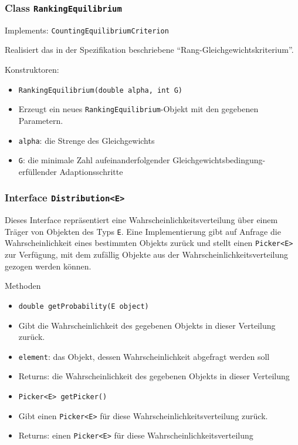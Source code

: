 \documentclass[parskip=full,11pt]{scrartcl}
\begin{document}
\subsubsection{Class \texttt{RankingEquilibrium}}
Implements: \texttt{CountingEquilibriumCriterion}

Realisiert das in der Spezifikation beschriebene \enquote{Rang-Gleichgewichtskriterium}.

Konstruktoren:
\begin{itemize}\itemsep -10pt
\item \texttt{RankingEquilibrium(double alpha, int G)}
\item[] Erzeugt ein neues \texttt{RankingEquilibrium}-Objekt mit den gegebenen Parametern.
\item[] \texttt{alpha}: die Strenge des Gleichgewichts
\item[] \texttt{G}: die minimale Zahl aufeinanderfolgender Gleichgewichtsbedingung-erfüllender Adaptionsschritte
\end{itemize}

\subsubsection{Interface \texttt{Distribution<E>}}
Dieses Interface repräsentiert eine Wahrscheinlichkeitsverteilung über einem Träger von Objekten des Typs \texttt{E}. Eine Implementierung gibt auf Anfrage die Wahrscheinlichkeit eines bestimmten Objekts zurück und stellt einen \texttt{Picker<E>} zur Verfügung, mit dem zufällig Objekte aus der Wahrscheinlichkeitsverteilung gezogen werden können.

Methoden
\begin{itemize}\itemsep -10pt
\item \texttt{double getProbability(E object)}
\item[] Gibt die Wahrscheinlichkeit des gegebenen Objekts in dieser Verteilung zurück.
\item[] \texttt{element}: das Objekt, dessen Wahrscheinlichkeit abgefragt werden soll
\item[] Returns: die Wahrscheinlichkeit des gegebenen Objekts in dieser Verteilung

\item \texttt{Picker<E> getPicker()}
\item[] Gibt einen \texttt{Picker<E>} für diese Wahrscheinlichkeitsverteilung zurück.
\item[] Returns: einen \texttt{Picker<E>} für diese Wahrscheinlichkeitsverteilung
\end{itemize}
\end{document}
